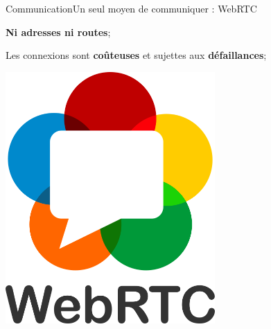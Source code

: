 \begin{frame}{Communication}{Un seul moyen de communiquer : WebRTC}


  \begin{minipage}{0.67\textwidth}

    \textbf{Ni adresses ni routes};
    \vspace{0.25cm} 

    Les connexions sont \textbf{coûteuses} et sujettes aux
    \textbf{défaillances};
    
  \end{minipage}
  \hfill
  \begin{minipage}{0.3\textwidth}
    \begin{center}
    \includegraphics[width=0.6\textwidth]{img/webrtc.png}
    \end{center}
  \end{minipage}
  
  \vspace{0.5cm}
      
  \begin{center}
    
  \end{center}



\end{frame}
